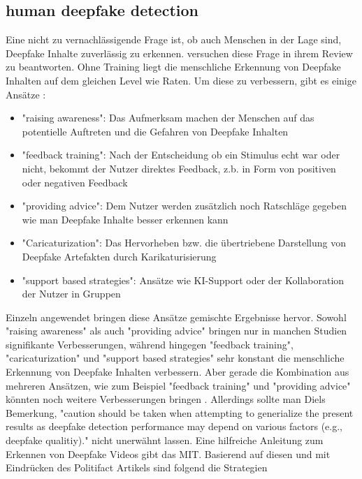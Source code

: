 \subsection{human deepfake detection}
Eine nicht zu vernachlässigende Frage ist, ob auch Menschen in der Lage sind, Deepfake Inhalte zuverlässig zu erkennen. 
\textcite{dielHumanPerformanceDetecting2024} versuchen diese Frage in ihrem Review zu beantworten. 
Ohne Training liegt die menschliche Erkennung von Deepfake Inhalten auf dem gleichen Level wie Raten. 
Um diese zu verbessern, gibt es einige Ansätze \cite{dielHumanPerformanceDetecting2024}:
\begin{itemize}
    \item "raising awareness": Das Aufmerksam machen der Menschen auf das potentielle Auftreten und die Gefahren von Deepfake Inhalten
    \item "feedback training": Nach der Entscheidung ob ein Stimulus echt war oder nicht, bekommt der Nutzer direktes Feedback, z.b. in Form von positiven oder negativen Feedback
    \item "providing advice": Dem Nutzer werden zusätzlich noch Ratschläge gegeben wie man Deepfake Inhalte besser erkennen kann
    \item "Caricaturization": Das Hervorheben bzw. die übertriebene Darstellung von Deepfake Artefakten durch Karikaturisierung
    \item "support based strategies": Ansätze wie KI-Support oder der Kollaboration der Nutzer in Gruppen
\end{itemize}
Einzeln angewendet bringen diese Ansätze gemischte Ergebnisse hervor. 
Sowohl "raising awareness" als auch "providing advice" bringen nur in manchen Studien signifikante Verbesserungen, 
während hingegen "feedback training", "caricaturization" und "support based strategies" sehr konstant die menschliche Erkennung von Deepfake Inhalten verbessern. 
Aber gerade die Kombination aus mehreren Ansätzen, wie zum Beispiel "feedback training" und "providing advice" könnten noch weitere Verbesserungen bringen \cite{dielHumanPerformanceDetecting2024}. 
Allerdings sollte man Diels Bemerkung, "caution should be taken when attempting to generialize the present results 
as deepfake detection performance may depend on various factors (e.g., deepfake qualitiy)." \cite{dielHumanPerformanceDetecting2024} nicht unerwähnt lassen.
Eine hilfreiche Anleitung zum Erkennen von Deepfake Videos gibt das MIT\cite{ProjectOverviewDetect}.
Basierend auf diesen und mit Eindrücken des Politifact \cite{settlesPolitiFactDemystifiesDeepfake} Artikels sind folgend die Strategien 
